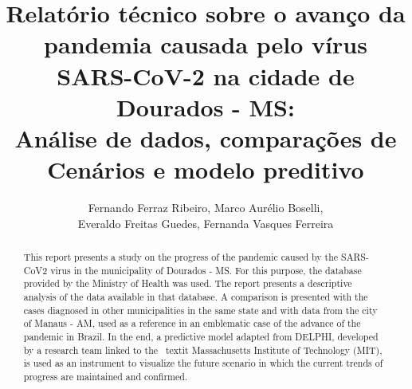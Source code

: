 \documentclass[12pt]{article}
\begin{document}
 


\title{Relatório técnico sobre o avanço da pandemia causada pelo vírus SARS-CoV-2 na cidade de Dourados - MS:\\ Análise de dados, comparações de Cenários e modelo preditivo}

\author{Fernando Ferraz Ribeiro, Marco Aurélio Boselli,\\ Everaldo Freitas Guedes, Fernanda Vasques Ferreira}
  

 

\address{Universidade Federal da Bahia -- Faculdade de Arquitetura -- LCAD
  (UFBA)\\
  Salvador, BA -- Brasil
\nextinstitute
  Universidade Federal de Uberlândia  -- Instituto de Física (UFU)\\
  Uberlândia, MG -- Brasil 
\nextinstitute
  Bacharel em Estatística, Doutor e Mestre em \\Modelagem Computacional Aplicada à Tecnologia Industrial\\
  Salvador, BA -- Brasil
\nextinstitute
  Universidade Federal do Oeste da Bahia (UFOB)\\
  Santa Maria da Vitória, BA -- Brasil
}


\maketitle

\begin{abstract}

  This report presents a study on the progress of the pandemic caused by the SARS-CoV2 virus in the municipality of Dourados - MS. For this purpose, the database provided by the Ministry of Health was used. The report presents a descriptive analysis of the data available in that database. A comparison is presented with the cases diagnosed in other municipalities in the same state and with data from the city of Manaus - AM, used as a reference in an emblematic case of the advance of the pandemic in Brazil. In the end, a predictive model adapted from DELPHI, developed by a research team linked to the \ textit {Massachusetts Institute of Technology} (MIT), is used as an instrument to visualize the future scenario in which the current trends of progress are maintained and confirmed.

\end{abstract}
     
\end{document}
